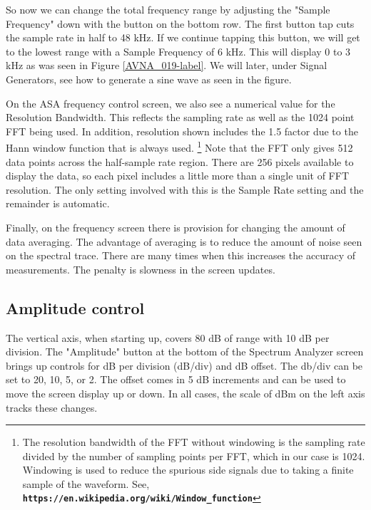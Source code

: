 So now we can change the total frequency range by adjusting the "Sample Frequency" down with the button on the bottom row.  The first button tap cuts the sample rate in half to 48 kHz.  If we continue tapping this button, we will get to the lowest range with a Sample Frequency of 6 kHz.  This will display 0 to 3 kHz as was seen in Figure  \ref{AVNA_019-label}.  We will later, under Signal Generators, see how to generate a sine wave as seen in the figure.


On the ASA frequency control screen,  we also see a numerical value for the Resolution Bandwidth.  This reflects the sampling rate as well as the 1024 point FFT being used.  In addition, resolution shown includes the 1.5 factor due to the Hann window function that is always used. \footnote{The resolution bandwidth of the FFT without windowing is the sampling rate divided by the number of sampling points per FFT, which in our case is 1024.  Windowing is used to reduce the spurious side signals due to taking a finite sample of the waveform.  See, \linebreak \textbf{\texttt{https://en.wikipedia.org/wiki/Window\_function}}}
%
Note that the FFT only gives 512 data points across the half-sample rate region.  There are 256 pixels available to display the data, so each pixel includes a little more than a single unit of FFT resolution.    The only setting involved with this is the Sample Rate setting and the remainder is automatic.

Finally, on the frequency screen there is provision for changing the amount of data averaging.  The advantage of averaging is to reduce the amount of noise seen on the spectral trace.  There are many times when this  increases the accuracy of measurements.  The penalty is slowness in the screen updates.

\subsection{Amplitude control} The vertical axis, when starting up, covers 80 dB of range with 10 dB per division.  The "\textsf{Amplitude}" button at the bottom of the Spectrum Analyzer screen brings up controls for dB per division (dB/div) and dB offset.  The db/div can be set to 20, 10, 5, or 2.  The offset comes in 5 dB increments and can be used to move the screen display up or down.  In all cases, the scale of dBm on the left axis tracks these changes.

